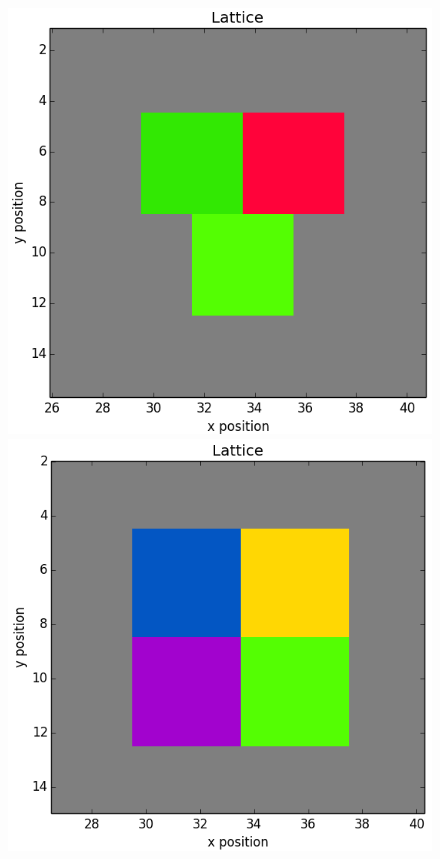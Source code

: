 \documentclass[12pt]{article}
\begin{document}
\begin{figure}[H]
	\includegraphics[scale=0.20]{img/3ctc_start}
	\includegraphics[scale=0.20]{img/4ctc_start}

\end{figure}
\end{document}

